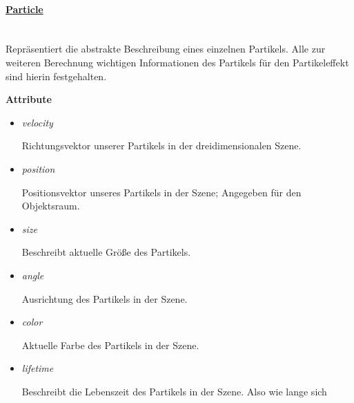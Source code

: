             \paragraph{\underline{Particle}} \mbox{}\\
                Repräsentiert die abstrakte Beschreibung eines einzelnen Partikels.
                Alle zur weiteren Berechnung wichtigen Informationen des Partikels für den 
                Partikeleffekt sind hierin festgehalten. \par
                \textbf{Attribute}
                \begin{itemize}
                    \item \textit{velocity}
                        \begin{leftbar}[0.9\linewidth]
                        Richtungsvektor unserer Partikels in der dreidimensionalen Szene.   
                        \end{leftbar}
                    \item \textit{position}
                        \begin{leftbar}[0.9\linewidth]
                        Positionsvektor unseres Partikels in der Szene; Angegeben für den Objektsraum.
                        \end{leftbar}
                    \pagebreak
                    \item \textit{size}
                        \begin{leftbar}[0.9\linewidth]
                        Beschreibt aktuelle Größe des Partikels.   
                        \end{leftbar}
                    \item \textit{angle}
                        \begin{leftbar}[0.9\linewidth]
                        Ausrichtung des Partikels in der Szene.   
                        \end{leftbar}    
                    \item \textit{color}
                        \begin{leftbar}[0.9\linewidth]
                        Aktuelle Farbe des Partikels in der Szene.  
                        \end{leftbar}
                    \item \textit{lifetime}
                        \begin{leftbar}[0.9\linewidth]
                        Beschreibt die Lebenszeit des Partikels in der Szene. Also wie lange sich

\end{leftbar}
\end{itemize}
